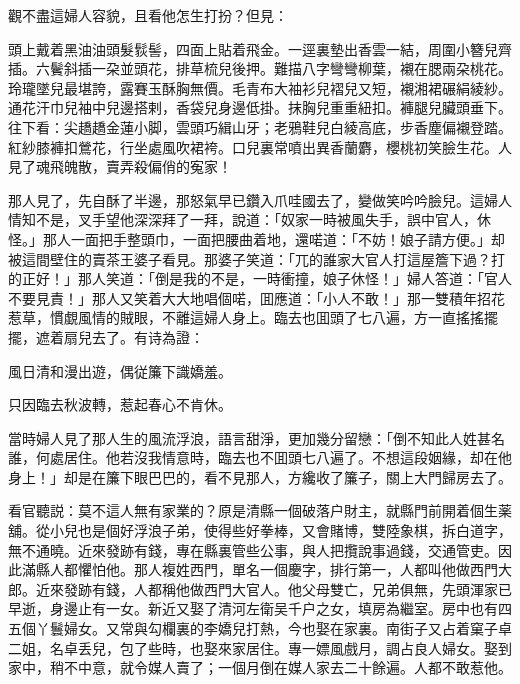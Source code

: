 觀不盡這婦人容貌，且看他怎生打扮？但見：

頭上戴着黑油油頭髮䯼髻，四面上貼着飛金。一逕裏墊出香雲一結，周圍小簪兒齊插。六鬢斜插一朶並頭花，排草梳兒後押。難描八字彎彎柳葉，襯在腮兩朶桃花。玲瓏墜兒最堪誇，露賽玉酥胸無價。毛青布大袖衫兒褶兒又短，襯湘裙碾絹綾紗。通花汗巾兒袖中兒邊搭剌，香袋兒身邊低掛。抹胸兒重重紐扣。褲腿兒臟頭垂下。往下看：尖趫趫金蓮小脚，雲頭巧緝山牙；老鴉鞋兒白綾高底，步香塵偏襯登踏。紅紗膝褲扣鶯花，行坐處風吹裙袴。口兒裏常噴出異香蘭麝，櫻桃初笑臉生花。人見了魂飛魄散，賣弄殺偏俏的寃家！

那人見了，先自酥了半邊，那怒氣早已鑽入爪哇國去了，變做笑吟吟臉兒。這婦人情知不是，叉手望他深深拜了一拜，說道：「奴家一時被風失手，誤中官人，休怪。」那人一面把手整頭巾，一面把腰曲着地，還喏道：「不妨！娘子請方便。」却被這間壁住的賣茶王婆子看見。那婆子笑道：「兀的誰家大官人打這屋簷下過？打的正好！」那人笑道：「倒是我的不是，一時衝撞，娘子休怪！」婦人答道：「官人不要見責！」那人又笑着大大地唱個喏，囬應道：「小人不敢！」那一雙積年招花惹草，慣覷風情的賊眼，不離這婦人身上。臨去也囬頭了七八遍，方一直搖搖擺擺，遮着扇兒去了。有诗為證：

風日清和漫出遊，偶従簾下識嬌羞。

只因臨去秋波轉，惹起春心不肯休。

當時婦人見了那人生的風流浮浪，語言甜淨，更加幾分留戀：「倒不知此人姓甚名誰，何處居住。他若沒我情意時，臨去也不囬頭七八遍了。不想這段姻緣，却在他身上！」却是在簾下眼巴巴的，看不見那人，方纔收了簾子，關上大門歸房去了。

看官聽説：莫不這人無有家業的？原是清縣一個破落户財主，就縣門前開着個生薬舖。從小兒也是個好浮浪子弟，使得些好拳棒，又會賭博，雙陸象棋，拆白道字，無不通曉。近來發跡有錢，專在縣裏管些公事，與人把攬說事過錢，交通管吏。因此滿縣人都懼怕他。那人複姓西門，單名一個慶字，排行第一，人都叫他做西門大郎。近來發跡有錢，人都稱他做西門大官人。他父母雙亡，兄弟俱無，先頭渾家已早逝，身邊止有一女。新近又娶了清河左衛吴千户之女，填房為繼室。房中也有四五個丫鬟婦女。又常與勾欄裏的李嬌兒打熱，今也娶在家裏。南街子又占着窠子卓二姐，名卓丢兒，包了些時，也娶來家居住。專一嫖風戲月，調占良人婦女。娶到家中，稍不中意，就令媒人賣了；一個月倒在媒人家去二十餘遍。人都不敢惹他。

